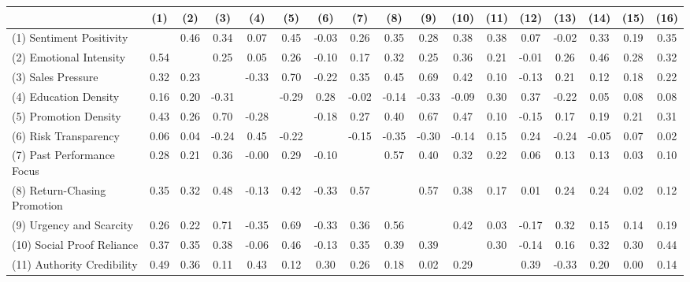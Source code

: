 \begin{landscape}
\begin{table}[!ht]
    \setlength{\tabcolsep}{5pt}
    \begin{tabular}{lcccccccccccccccc}
      \hline
                                      & (1)   & (2)  & (3)   & (4)   & (5)   & (6)   & (7)   & (8)   & (9)   & (10)  & (11)  & (12)  & (13)  & (14)  & (15)  & (16)  \\ \hline
      (1) Sentiment Positivity        &       & 0.46 & 0.34  & 0.07  & 0.45  & -0.03 & 0.26  & 0.35  & 0.28  & 0.38  & 0.38  & 0.07  & -0.02 & 0.33  & 0.19  & 0.35  \\
      (2) Emotional Intensity         & 0.54  &      & 0.25  & 0.05  & 0.26  & -0.10 & 0.17  & 0.32  & 0.25  & 0.36  & 0.21  & -0.01 & 0.26  & 0.46  & 0.28  & 0.32  \\
      (3) Sales Pressure              & 0.32  & 0.23 &       & -0.33 & 0.70  & -0.22 & 0.35  & 0.45  & 0.69  & 0.42  & 0.10  & -0.13 & 0.21  & 0.12  & 0.18  & 0.22  \\
      (4) Education Density           & 0.16  & 0.20 & -0.31 &       & -0.29 & 0.28  & -0.02 & -0.14 & -0.33 & -0.09 & 0.30  & 0.37  & -0.22 & 0.05  & 0.08  & 0.08  \\
      (5) Promotion Density           & 0.43  & 0.26 & 0.70  & -0.28 &       & -0.18 & 0.27  & 0.40  & 0.67  & 0.47  & 0.10  & -0.15 & 0.17  & 0.19  & 0.21  & 0.31  \\
      (6) Risk Transparency           & 0.06  & 0.04 & -0.24 & 0.45  & -0.22 &       & -0.15 & -0.35 & -0.30 & -0.14 & 0.15  & 0.24  & -0.24 & -0.05 & 0.07  & 0.02  \\
      (7) Past Performance Focus      & 0.28  & 0.21 & 0.36  & -0.00 & 0.29  & -0.10 &       & 0.57  & 0.40  & 0.32  & 0.22  & 0.06  & 0.13  & 0.13  & 0.03  & 0.10  \\
      (8) Return-Chasing Promotion    & 0.35  & 0.32 & 0.48  & -0.13 & 0.42  & -0.33 & 0.57  &       & 0.57  & 0.38  & 0.17  & 0.01  & 0.24  & 0.24  & 0.02  & 0.12  \\
      (9) Urgency and Scarcity        & 0.26  & 0.22 & 0.71  & -0.35 & 0.69  & -0.33 & 0.36  & 0.56  &       & 0.42  & 0.03  & -0.17 & 0.32  & 0.15  & 0.14  & 0.19  \\
      (10) Social Proof Reliance      & 0.37  & 0.35 & 0.38  & -0.06 & 0.46  & -0.13 & 0.35  & 0.39  & 0.39  &       & 0.30  & -0.14 & 0.16  & 0.32  & 0.30  & 0.44  \\
      (11) Authority Credibility      & 0.49  & 0.36 & 0.11  & 0.43  & 0.12  & 0.30  & 0.26  & 0.18  & 0.02  & 0.29  &       & 0.39  & -0.33 & 0.20  & 0.00  & 0.14  \\

\end{tabular}
\end{table}
\end{landscape}
